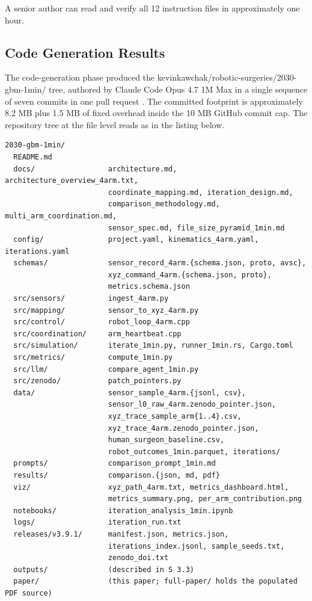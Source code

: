 A senior author can read and verify all 12 instruction files in
approximately one hour.


\subsection{Code Generation Results}
\label{sec:results-code-generation}

The code-generation phase produced the
kevinkawchak/robotic-surgeries/2030-gbm-1min/ tree, authored by
Claude Code Opus 4.7 1M Max \cite{claude-opus-47, claude-code} in a
single sequence of seven commits in one pull request
\cite{repo-robotic-surgeries}. The committed footprint is
approximately 8.2 MB plus 1.5 MB of fixed overhead inside the 10 MB
GitHub commit cap. The repository tree at the file level reads as
in the listing below.

\begin{verbatim}
2030-gbm-1min/
  README.md
  docs/                 architecture.md, architecture_overview_4arm.txt,
                        coordinate_mapping.md, iteration_design.md,
                        comparison_methodology.md, multi_arm_coordination.md,
                        sensor_spec.md, file_size_pyramid_1min.md
  config/               project.yaml, kinematics_4arm.yaml, iterations.yaml
  schemas/              sensor_record_4arm.{schema.json, proto, avsc},
                        xyz_command_4arm.{schema.json, proto},
                        metrics.schema.json
  src/sensors/          ingest_4arm.py
  src/mapping/          sensor_to_xyz_4arm.py
  src/control/          robot_loop_4arm.cpp
  src/coordination/     arm_heartbeat.cpp
  src/simulation/       iterate_1min.py, runner_1min.rs, Cargo.toml
  src/metrics/          compute_1min.py
  src/llm/              compare_agent_1min.py
  src/zenodo/           patch_pointers.py
  data/                 sensor_sample_4arm.{jsonl, csv},
                        sensor_l0_raw_4arm.zenodo_pointer.json,
                        xyz_trace_sample_arm{1..4}.csv,
                        xyz_trace_4arm.zenodo_pointer.json,
                        human_surgeon_baseline.csv,
                        robot_outcomes_1min.parquet, iterations/
  prompts/              comparison_prompt_1min.md
  results/              comparison.{json, md, pdf}
  viz/                  xyz_path_4arm.txt, metrics_dashboard.html,
                        metrics_summary.png, per_arm_contribution.png
  notebooks/            iteration_analysis_1min.ipynb
  logs/                 iteration_run.txt
  releases/v3.9.1/      manifest.json, metrics.json,
                        iterations_index.jsonl, sample_seeds.txt,
                        zenodo_doi.txt
  outputs/              (described in S 3.3)
  paper/                (this paper; full-paper/ holds the populated PDF source)
\end{verbatim}

